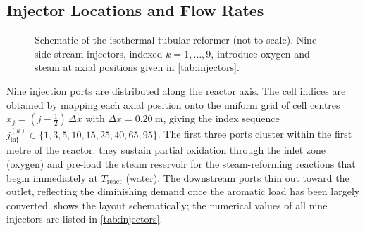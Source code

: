 \subsection{Injector Locations and Flow Rates}\label{ssec:injector_table}

\begin{figure}[H]
\centering
{}
\caption{Schematic of the isothermal tubular reformer (not to scale). Nine side-stream injectors, indexed \(k = 1, \ldots, 9\), introduce oxygen and steam at axial positions given in \cref{tab:injectors}.}%
\label{fig:reactor_schematic}
\end{figure}

Nine injection ports are distributed along the reactor axis. The cell indices are obtained by mapping each axial position onto the uniform grid of cell centres \(x_j = (j - \tfrac{1}{2})\,\Delta x\) with \(\Delta x = \SI{0.20}{\metre}\), giving the index sequence \(j_{\mathrm{inj}}^{(k)} \in \{1, 3, 5, 10, 15, 25, 40, 65, 95\}\). The first three ports cluster within the first metre of the reactor: they sustain partial oxidation through the inlet zone (oxygen) and pre-load the steam reservoir for the steam-reforming reactions that begin immediately at \(T_{\mathrm{react}}\) (water). The downstream ports thin out toward the outlet, reflecting the diminishing demand once the aromatic load has been largely converted.  shows the layout schematically; the numerical values of all nine injectors are listed in \cref{tab:injectors}.

